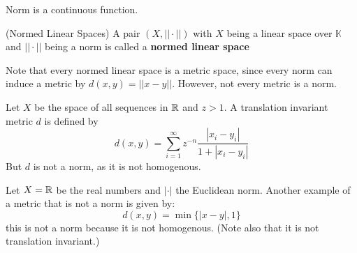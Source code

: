 \documentclass{article}
\begin{document}
\begin{remark}
    Norm is a continuous function.
\end{remark}

\begin{defn}
(Normed Linear Spaces) A pair $(X, ||\cdot||)$ with $X$ being a linear space over $\mathbb{K}$ and 
                    $||\cdot||$ being a norm is called a \textbf{normed linear space}
\end{defn} 

Note that every normed linear space is a metric space, since every norm can induce a metric by $d(x,y)=||x-y||$. 
However, not every metric is a norm.  

\begin{eg}
    Let $X$ be the space of all sequences in $\mathbb{R}$ and $z>1$. A translation invariant metric $d$ is defined by  
    \begin{equation*}
        d(x,y) = \sum_{i=1}^{\infty} z^{-n} \dfrac{|x_i-y_i|}{1+|x_i-y_i|}
    \end{equation*}  
    But $d$ is not a norm, as it is not homogenous.
\end{eg}  

\begin{eg}
    Let $X=\mathbb{R}$ be the real numbers and $|\cdot|$ the Euclidean norm. Another example of a metric that is not a norm 
    is given by:
    \begin{equation*}
        d(x,y) = \min \{|x-y|, 1\}
    \end{equation*}  
    this is not a norm because it is not homogenous. (Note also that it is not translation invariant.)
\end{eg}  


\end{document}
